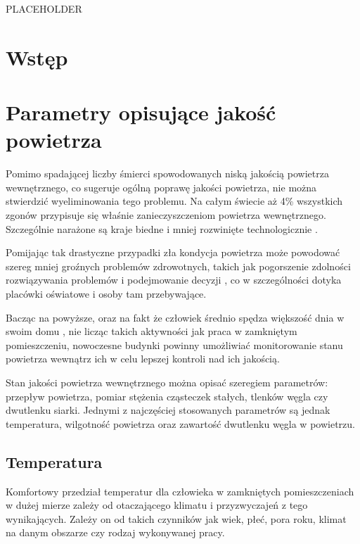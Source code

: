 \documentclass[a4paper, 12pt]{article}
\begin{document}
\vspace*{\fill}

PLACEHOLDER

\vspace*{\fill}

\newpage

\section{Wstęp}

\section{Parametry opisujące jakość powietrza}

Pomimo spadającej liczby śmierci spowodowanych niską jakością powietrza 
wewnętrznego, co sugeruje ogólną poprawę jakości powietrza, nie można 
stwierdzić wyeliminowania tego problemu. Na całym świecie aż 4\% wszystkich 
zgonów przypisuje się właśnie zanieczyszczeniom powietrza wewnętrznego. 
Szczególnie narażone są kraje biedne i mniej rozwinięte technologicznie \cite{owid}.

Pomijając tak drastyczne przypadki zła kondycja powietrza może powodować szereg mniej 
groźnych problemów zdrowotnych, takich jak pogorszenie zdolności rozwiązywania 
problemów i podejmowanie decyzji \cite{co2-effects}, co w szczególności dotyka placówki oświatowe i 
osoby tam przebywające. 

Bacząc na powyższe, oraz na fakt że człowiek średnio spędza większość dnia w swoim 
domu \cite{time-indoors}, nie licząc takich aktywności jak praca w zamkniętym pomieszczeniu, nowoczesne 
budynki powinny umożliwiać monitorowanie stanu powietrza wewnątrz 
ich w celu lepszej kontroli nad ich jakością.

Stan jakości powietrza wewnętrznego można opisać szeregiem parametrów: przepływ powietrza, 
pomiar stężenia cząsteczek stałych, tlenków węgla czy dwutlenku siarki. Jednymi z 
najczęściej stosowanych parametrów są jednak temperatura, wilgotność powietrza oraz 
zawartość dwutlenku węgla w powietrzu. 

\subsection{Temperatura}

Komfortowy przedział temperatur dla człowieka w zamkniętych pomieszczeniach w dużej 
mierze zależy od otaczającego klimatu i przyzwyczajeń z tego wynikających. Zależy on od takich czynników 
jak wiek, płeć, pora roku, klimat na danym obszarze czy rodzaj wykonywanej pracy.
\end{document}
